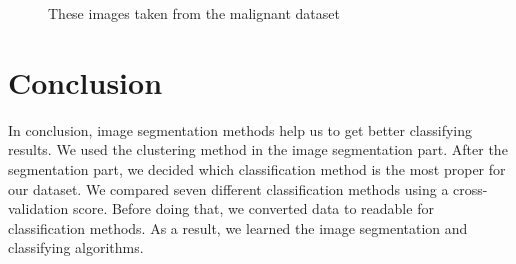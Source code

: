 \documentclass[onecolumn]{article}
\begin{document}
\begin{figure}[H]
    \qquad
    \subfloat
    \qquad
    \subfloat
    \caption{These images taken from the malignant dataset}%
    \label{fig:2}%
\end{figure}

\section{Conclusion}
In conclusion, image segmentation methods help us to get better classifying results. We used the clustering method in the image segmentation part. After the segmentation part, we decided which classification method is the most proper for our dataset. We compared seven different classification methods using a cross-validation score. Before doing that, we converted data to readable for classification methods. As a result, we learned the image segmentation and classifying algorithms.




\nocite{*}


\end{document}
